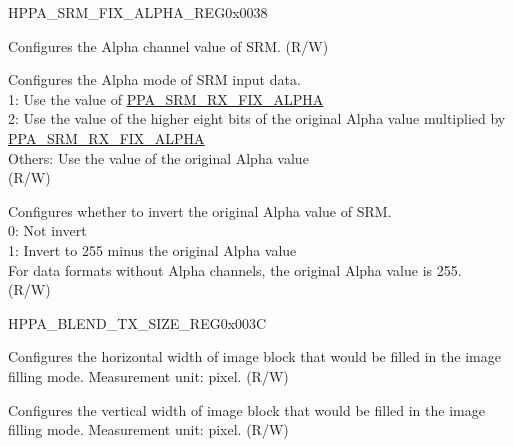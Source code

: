 \begin{register}{H}{PPA\_SRM\_FIX\_ALPHA\_REG}{0x0038}\label{regdesc:PPASRMFIXALPHAREG}
%
%
%
%
\regnewline%
\begin{regdesc}\begin{reglist}
\label{fielddesc:PPASRMRXFIXALPHA}\item [PPA\_SRM\_RX\_FIX\_ALPHA] Configures the Alpha channel value of SRM. (R/W)
\label{fielddesc:PPASRMRXALPHAMOD}\item [PPA\_SRM\_RX\_ALPHA\_MOD] Configures the Alpha mode of SRM input data.\\
1: Use the value of \hyperref[fielddesc:PPASRMRXFIXALPHA]{PPA\_SRM\_RX\_FIX\_ALPHA}\\
2: Use the value of the higher eight bits of the original Alpha value multiplied by \hyperref[fielddesc:PPASRMRXFIXALPHA]{PPA\_SRM\_RX\_FIX\_ALPHA}\\
Others: Use the value of the original Alpha value\\
(R/W)
\label{fielddesc:PPASRMRXALPHAINV}\item [PPA\_SRM\_RX\_ALPHA\_INV] Configures whether to invert the original Alpha value of SRM.\\
0: Not invert\\
1: Invert to 255 minus the original Alpha value\\
For data formats without Alpha channels, the original Alpha value is 255. \\
(R/W)
\end{reglist}\end{regdesc}
\end{register}


\begin{register}{H}{PPA\_BLEND\_TX\_SIZE\_REG}{0x003C}\label{regdesc:PPABLENDTXSIZEREG}
%
%
%
\regnewline%
\begin{regdesc}\begin{reglist}
\label{fielddesc:PPABLENDHB}\item [PPA\_BLEND\_HB] Configures the horizontal width of image block that would be filled in the image filling mode. Measurement unit: pixel. (R/W)
\label{fielddesc:PPABLENDVB}\item [PPA\_BLEND\_VB] Configures the vertical width of image block that would be filled in the image filling mode. Measurement unit: pixel. (R/W)
\end{reglist}\end{regdesc}
\end{register}


